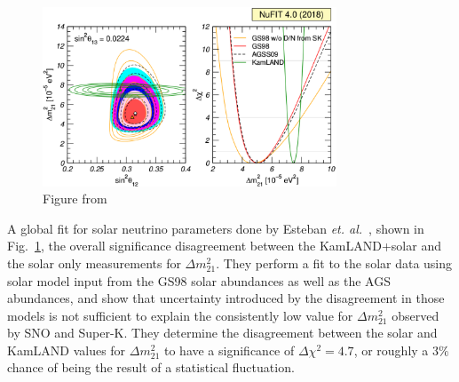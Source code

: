\begin{figure}[htbp]
    \centering
    \includegraphics[width=0.78\textwidth]{nufit_dm21_tension}
    \caption[]{Figure from~\citep{nu_fit4}}
    \label{fig:nufit_dm21_tension}
\end{figure}
A global fit for solar neutrino parameters done by Esteban \textit{et. al.}~\citep{nu_fit4},
shown in Fig.~\ref{fig:nufit_dm21_tension},
the overall significance disagreement between the KamLAND+solar and the solar only
measurements for $\Delta m^{2}_{21}$.
They perform a fit to the solar data using solar model input from the GS98 solar abundances
as well as the AGS abundances, and show that uncertainty introduced by the
disagreement in those models is not sufficient to explain the consistently
low value for $\Delta m^{2}_{21}$ observed by SNO and Super-K.
They determine the disagreement between the solar and KamLAND values for
$\Delta m^{2}_{21}$ to have a significance of $\Delta \chi^{2} = 4.7$, or
roughly a $3\%$ chance of being the result of a statistical fluctuation.


